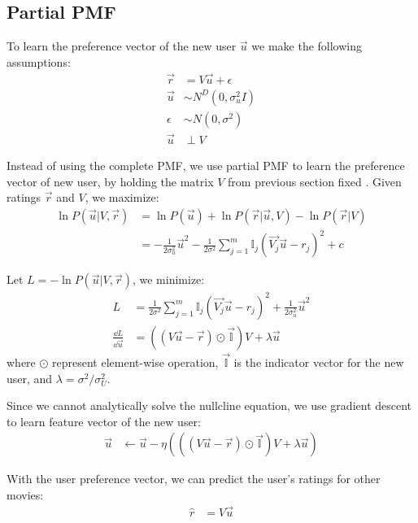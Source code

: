 \documentclass{article}
\begin{document}
\subsection{Partial PMF}
To learn the preference vector of the new user $\vec{u}$ we make the following assumptions:
\begin{align}
    \vec{r}  & = V \vec{u} + \epsilon    \\
    \vec{u}  & \sim N^D(0, \sigma_u^2 I) \\
    \epsilon & \sim N(0, \sigma^2)       \\
    \vec{u}  & \perp V
\end{align}

Instead of using the complete PMF, we use partial PMF to learn the preference vector of new user, by holding the matrix $V$ from previous section fixed \cite{salakhutdinov2007}. Given ratings $\vec{r}$ and $V$, we maximize:
\begin{align}
    \ln{P(\vec{u} | V, \vec{r})} & = \ln{P(\vec{u})} + \ln{P(\vec{r} | \vec{u}, V)} - \ln{P(\vec{r} | V)}                                               \\
                                 & = -\frac{1}{2 \sigma_u^2} \vec{u}^2 - \frac{1}{2 \sigma^2} \sum_{j=1}^m \mathbb{I}_j (\vec{V_j} \vec{u} - r_j)^2 + c
\end{align}

Let $L = -\ln{P(\vec{u} | V, \vec{r})}$, we minimize:
\begin{align}
    L                         & = \frac{1}{2 \sigma^2} \sum_{j=1}^m \mathbb{I}_j (\vec{V_j} \vec{u} - r_j)^2 + \frac{1}{2 \sigma_u^2} \vec{u}^2 \\
    \frac{\dd L}{\dd \vec{u}} & = ((V \vec{u} - \vec{r}) \odot \vec{\mathbb{I}}) V + \lambda \vec{u}
\end{align}
where $\odot$ represent element-wise operation, $\vec{\mathbb{I}}$ is the indicator vector for the new user, and $\lambda = \sigma^2 / \sigma_U^2$.

Since we cannot analytically solve the nullcline equation, we use gradient descent to learn feature vector of the new user:
\begin{align}
    \vec{u} & \leftarrow \vec{u} - \eta \left(((V \vec{u} - \vec{r}) \odot \vec{\mathbb{I}}) V + \lambda \vec{u}\right)
\end{align}

With the user preference vector, we can predict the user's ratings for other movies:
\begin{align}
    \hat{r} & = V \vec{u}
\end{align}
\end{document}
